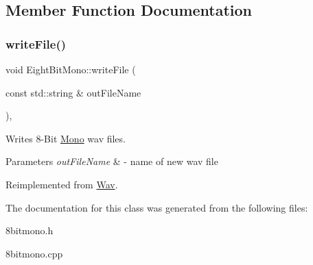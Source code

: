 \subsection{Member Function Documentation}
\mbox{\label{classEightBitMono_ae654eb1cc4fbb5586b33a73081cfb033}} 
\subsubsection{\texorpdfstring{write\+File()}{writeFile()}}
{\footnotesize\ttfamily void Eight\+Bit\+Mono\+::write\+File (\begin{DoxyParamCaption}\item[{const std\+::string \&}]{out\+File\+Name }\end{DoxyParamCaption})\hspace{0.3cm}{\ttfamily [override]}, {\ttfamily [virtual]}}

Writes 8-\/\+Bit \hyperlink{classMono}{Mono} wav files.


\begin{DoxyParams}{Parameters}
{\em out\+File\+Name} & -\/ name of new wav file \\
\hline
\end{DoxyParams}


Reimplemented from \hyperlink{classWav_a7bae34f37288c53cb113e76045f78098}{Wav}.



The documentation for this class was generated from the following files\+:\begin{DoxyCompactItemize}
\item 
8bitmono.\+h\item 
8bitmono.\+cpp\end{DoxyCompactItemize}
